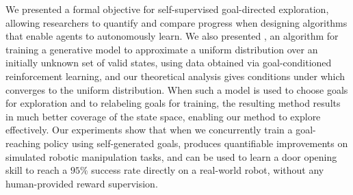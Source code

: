 We presented a formal objective for self-supervised goal-directed exploration, allowing researchers to quantify and compare progress when designing algorithms that enable agents to autonomously learn.
We also presented \METHOD, an algorithm for training a generative model to approximate a uniform distribution over an initially unknown set of valid states, using data obtained via goal-conditioned reinforcement learning, and our theoretical analysis gives conditions under which \METHOD converges to the uniform distribution.
When such a model is used to choose goals for exploration and to relabeling goals for training, the resulting method results in much better coverage of the state space, enabling our method to explore effectively.
Our experiments show that when we concurrently train a goal-reaching policy using self-generated goals, \METHOD produces quantifiable improvements on simulated robotic manipulation tasks, and can be used to learn a door opening skill to reach a $95\%$ success rate directly on a real-world robot, without any human-provided reward supervision.